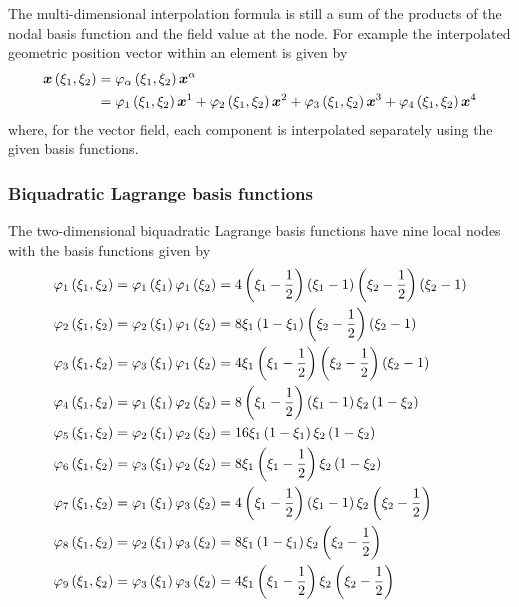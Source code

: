The multi-dimensional interpolation formula is still a sum of the products of
the nodal basis function and the field value at the node. For example the
interpolated geometric position vector within an element is given by
\begin{equation}
  \begin{split}
    \fnof{\vect{x}}{\xione,\xitwo}&=\lbfn{\alpha}{\xione,\xitwo}
    \nodept{\vect{x}}{\alpha}\\
    &=\lbfn{1}{\xione,\xitwo}\nodept{\vect{x}}{1}+\lbfn{2}{\xione,\xitwo}
    \nodept{\vect{x}}{2}+\lbfn{3}{\xione,\xitwo}\nodept{\vect{x}}{3}+
    \lbfn{4}{\xione,\xitwo}\nodept{\vect{x}}{4}
  \end{split}
\end{equation}
where, for the vector field, each component is interpolated separately using
the given basis functions.

\subsubsection{Biquadratic Lagrange basis functions}

The two-dimensional biquadratic Lagrange basis functions have nine local nodes
with the basis functions given by
\begin{equation}
  \begin{split}
       \varphi_{1} \left( \xi_{1},\xi_{2} \right)  &=   \varphi_{1} \left( \xi_{1} \right)     \varphi_{1} \left( \xi_{2} \right)  =
    4\left( \xi_{1}-\frac12 \right)\left( \xi_{1}-1 \right)\left( \xi_{2}-\frac12 \right)\left( \xi_{2}-1 \right) \\
       \varphi_{2} \left( \xi_{1},\xi_{2} \right)  &=   \varphi_{2} \left( \xi_{1} \right)     \varphi_{1} \left( \xi_{2} \right)  =
    8\xi_{1}\left( 1-\xi_{1} \right)\left( \xi_{2}-\frac12 \right)\left( \xi_{2}-1 \right) \\
       \varphi_{3} \left( \xi_{1},\xi_{2} \right)  &=   \varphi_{3} \left( \xi_{1} \right)     \varphi_{1} \left( \xi_{2} \right)  =
    4\xi_{1}\left( \xi_{1}-\frac12 \right)\left( \xi_{2}-\frac12 \right)\left( \xi_{2}-1 \right) \\
       \varphi_{4} \left( \xi_{1},\xi_{2} \right)  &=   \varphi_{1} \left( \xi_{1} \right)     \varphi_{2} \left( \xi_{2} \right)  =
    8\left( \xi_{1}-\frac12 \right)\left( \xi_{1}-1 \right)\xi_{2}\left( 1-\xi_{2} \right) \\
       \varphi_{5} \left( \xi_{1},\xi_{2} \right)  &=   \varphi_{2} \left( \xi_{1} \right)     \varphi_{2} \left( \xi_{2} \right)  =
    16\xi_{1}\left( 1-\xi_{1} \right)\xi_{2}\left( 1-\xi_{2} \right) \\
       \varphi_{6} \left( \xi_{1},\xi_{2} \right)  &=   \varphi_{3} \left( \xi_{1} \right)     \varphi_{2} \left( \xi_{2} \right)  =
    8\xi_{1}\left( \xi_{1}-\frac12 \right)\xi_{2}\left( 1-\xi_{2} \right) \\
       \varphi_{7} \left( \xi_{1},\xi_{2} \right)  &=   \varphi_{1} \left( \xi_{1} \right)     \varphi_{3} \left( \xi_{2} \right)  =
    4\left( \xi_{1}-\frac12 \right)\left( \xi_{1}-1 \right)\xi_{2}\left( \xi_{2}-\frac12 \right) \\
       \varphi_{8} \left( \xi_{1},\xi_{2} \right)  &=   \varphi_{2} \left( \xi_{1} \right)     \varphi_{3} \left( \xi_{2} \right)  =
    8\xi_{1}\left( 1-\xi_{1} \right)\xi_{2}\left( \xi_{2}-\frac12 \right) \\
       \varphi_{9} \left( \xi_{1},\xi_{2} \right)  &=   \varphi_{3} \left( \xi_{1} \right)     \varphi_{3} \left( \xi_{2} \right)  =
    4\xi_{1}\left( \xi_{1}-\frac12 \right)\xi_{2}\left( \xi_{2}-\frac12 \right)
  \end{split}
\end{equation}

